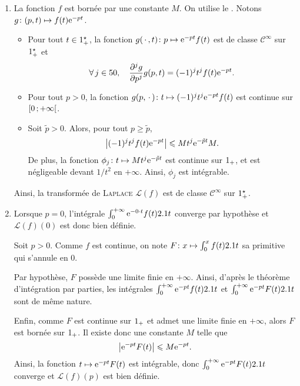 \begin{demo}
\begin{enumerate}
\item La fonction $f$ est bornée par une constante $M$. On utilise le . Notons $\fonctionligne[g]{(p, t)}{f(t) \e^{-pt}}$.
\begin{itemize}
\item Pour tout $t \in \Rpe$, la fonction $\fonctionligne[g(\,\cdot\,, t)]{p}{\e^{-p t} f(t)}$ est de classe $\mathscr{C}^\infty$ sur $\Rpe$ et
\[
\forall j \in \N,\quad \frac{\partial^j g}{\partial p^j} g(p, t) = (-1)^j t^j f(t) \e^{-pt}.
\]

\item Pour tout $p > 0$, la fonction $\fonctionligne[g(p,\,\cdot\,)]{t}{(-1)^j t^j \e^{-p t} f(t)}$ est continue sur $\interfo{0}{+\infty}$.

\item Soit $\tilde{p} > 0$. Alors, pour tout $p \geqslant \tilde{p}$,
\[
\abs{(-1)^j t^j f(t) \e^{-p t}} \leqslant M t^j \e^{- \tilde{p} t} M.
\]
De plus, la fonction $\fonctionligne[\phi_j]{t}{M t^j \e^{-\tilde{p} t}}$ est continue sur $\Rp$, et est négligeable devant $1/t^2$ en $+\infty$. Ainsi, $\phi_j$ est intégrable.
\end{itemize}
Ainsi, la transformée de \textsc{Laplace} $\mathscr{L}(f)$ est de classe $\mathscr{C}^\infty$ sur $\Rpe$.

\item Lorsque $p = 0$, l'intégrale $\int_0^{+\infty} \e^{-0\cdot t} f(t) \d t$ converge par hypothèse et $\mathscr{L}(f)(0)$ est donc bien définie.

\medskip

Soit $p > 0$. Comme $f$ est continue, on note $\fonctionligne[F]{x}{\int_0^x f(t) \d t}$ sa primitive qui s'annule en $0$.

Par hypothèse, $F$ possède une limite finie en $+\infty$. Ainsi, d'après le théorème d'intégration par parties, les intégrales $\int_0^{+\infty} \e^{-p t} f(t) \d t$ et $\int_0^{+\infty} \e^{-p t} F(t) \d t$ sont de même nature.

Enfin, comme $F$ est continue sur $\Rp$ et admet une limite finie en $+\infty$, alors $F$ est bornée sur $\Rp$. Il existe donc une constante $M$ telle que
\[
\module{\e^{-p t} F(t)} \leqslant M \e^{-p t}.
\]
Ainsi, la fonction $t \mapsto \e^{-p t} F(t)$ est intégrable, donc $\int_0^{+\infty} \e^{-p t} F(t) \d t$ converge et $\mathscr{L}(f)(p)$ est bien définie.


\end{enumerate}
\end{demo}
